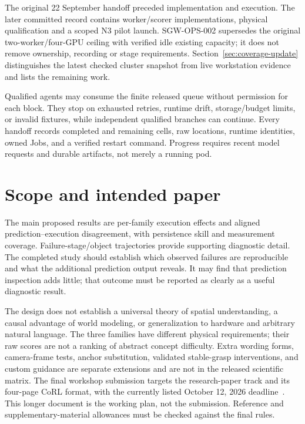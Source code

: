 \documentclass[11pt]{article}
\begin{document}
The original 22 September handoff preceded implementation and execution. The later committed record contains worker/scorer implementations, physical qualification and a scoped N3 pilot launch. SGW-OPS-002 supersedes the original two-worker/four-GPU ceiling with verified idle existing capacity; it does not remove ownership, recording or stage requirements. Section~\ref{sec:coverage-update} distinguishes the latest checked cluster snapshot from live workstation evidence and lists the remaining work.

Qualified agents may consume the finite released queue without permission for each block. They stop on exhausted retries, runtime drift, storage/budget limits, or invalid fixtures, while independent qualified branches can continue. Every handoff records completed and remaining cells, raw locations, runtime identities, owned Jobs, and a verified restart command. Progress requires recent model requests and durable artifacts, not merely a running pod.

\section{Scope and intended paper}
The main proposed results are per-family execution effects and aligned prediction--execution disagreement, with persistence skill and measurement coverage. Failure-stage/object trajectories provide supporting diagnostic detail. The completed study should establish which observed failures are reproducible and what the additional prediction output reveals. It may find that prediction inspection adds little; that outcome must be reported as clearly as a useful diagnostic result.

The design does not establish a universal theory of spatial understanding, a causal advantage of world modeling, or generalization to hardware and arbitrary natural language. The three families have different physical requirements; their raw scores are not a ranking of abstract concept difficulty. Extra wording forms, camera-frame tests, anchor substitution, validated stable-grasp interventions, and custom guidance are separate extensions and are not in the released scientific matrix. The final workshop submission targets the research-paper track and its four-page CoRL format, with the currently listed October 12, 2026 deadline~\cite{workshop}. This longer document is the working plan, not the submission. Reference and supplementary-material allowances must be checked against the final rules.
\end{document}
